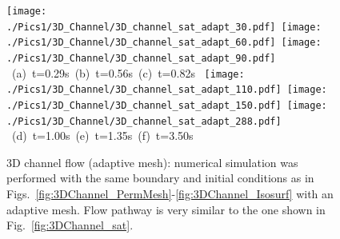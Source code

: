 \begin{landscape}
  \begin{figure}[ht]
  \vbox{\vspace{-.5cm}
      \hbox{\texttt{[image: ./Pics1/3D\_Channel/3D\_channel\_sat\_adapt\_30.pdf]} 
            \texttt{[image: ./Pics1/3D\_Channel/3D\_channel\_sat\_adapt\_60.pdf]}
            \texttt{[image: ./Pics1/3D\_Channel/3D\_channel\_sat\_adapt\_90.pdf]} }
      \hbox{\hspace{3.0cm} (a) t=0.29s \hspace{4.cm} (b) t=0.56s \hspace{4.cm} (c) t=0.82s}
      \vspace{1.5cm}
      \hbox{\hspace{.5cm} \texttt{[image: ./Pics1/3D\_Channel/3D\_channel\_sat\_adapt\_110.pdf]}
            \texttt{[image: ./Pics1/3D\_Channel/3D\_channel\_sat\_adapt\_150.pdf]}
            \texttt{[image: ./Pics1/3D\_Channel/3D\_channel\_sat\_adapt\_288.pdf]} }
      \hbox{\hspace{3.cm} (d) t=1.00s \hspace{3.cm} (e) t=1.35s\hspace{4.cm} (f) t=3.50s }}
\caption{3D channel flow (adaptive mesh): numerical simulation was performed with the same boundary and initial conditions as in Figs.~\ref{fig:3DChannel_PermMesh}-\ref{fig:3DChannel_Isosurf} with an adaptive mesh. Flow pathway is very similar to the one shown in Fig.~\ref{fig:3DChannel_sat}.}
\label{fig:3DChannel_sat_adapt}
\end{figure}
\end{landscape}
\clearpage


